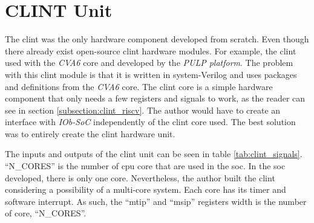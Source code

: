 \section{CLINT Unit}
\label{section:clint}
The \acrshort{clint} was the only hardware component developed from scratch. Even though there already exist open-source \acrfull{clint} hardware modules. For example, the \acrshort{clint} used with the \textit{CVA6} core and developed by the \textit{PULP platform}. The problem with this \acrshort{clint} module is that it is written in system-Verilog and uses packages and definitions from the \textit{CVA6} core. The \acrshort{clint} core is a simple hardware component that only needs a few registers and signals to work, as the reader can see in section \ref{subsection:clint_riscv}. The author would have to create an interface with \textit{IOb-SoC} independently of the \acrshort{clint} core used. The best solution was to entirely create the \acrshort{clint} hardware unit.

The inputs and outputs of the \acrshort{clint} unit can be seen in table \ref{tab:clint_signals}. \enquote{N\_CORES} is the number of \acrshort{cpu} core that are used in the \acrshort{soc}. In the \acrfull{soc} developed, there is only one core. Nevertheless, the author built the \acrshort{clint} considering a possibility of a multi-core system. Each core has its timer and software interrupt. As such, the \enquote{mtip} and \enquote{msip} registers width is the number of core, \enquote{N\_CORES}.

